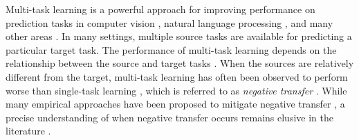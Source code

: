 Multi-task learning is a powerful approach for improving performance on prediction tasks in computer vision \cite{chexnet17,ZSSGM18}, natural language processing \cite{GLUE,superglue}, and many other areas \cite{ZY17}.
In many settings, multiple source tasks are available for predicting a particular target task.
The performance of multi-task learning depends on the relationship between the source and target tasks \cite{C97}.
When the sources are relatively different from the target, multi-task learning has often been observed to perform worse than single-task learning \cite{AP16,BS17}, which is referred to as \textit{negative transfer} \cite{PY09}.
While many empirical approaches have been proposed to mitigate negative transfer \cite{ZY17}, a precise understanding of when negative transfer occurs remains elusive in the literature \cite{R17}.


